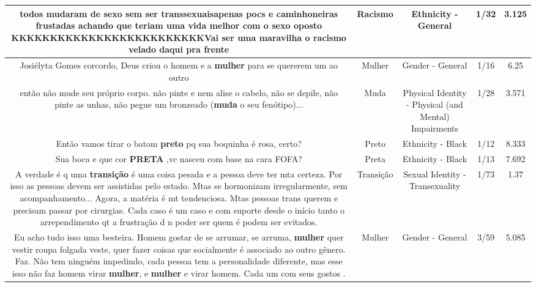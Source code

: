 \documentclass[11pt]{article}
\newlength\mylength
\begin{document}
\begin{center}
\begin{longtable}{|C{.65\mylength}|C{.30\mylength}|C{.12\mylength}|C{.12\mylength}|C{.12\mylength}|}
  \small todos mudaram de sexo sem ser transsexuaisapenas pocs e caminhoneiras frustadas achando que teriam uma vida melhor com o sexo oposto KKKKKKKKKKKKKKKKKKKKKKKKKVai ser uma maravilha o \textbf{racismo} velado daqui pra frente\normalsize   & Racismo & Ethnicity - General & 1/32 & 3.125 \\  \hline
  \small Josiélyta Gomes corcordo, Deus criou o homem e a \textbf{mulher} para se quererem um ao outro\normalsize   & Mulher & Gender - General & 1/16 & 6.25 \\  \hline
  \small então não mude seu próprio corpo. não pinte e nem alise o cabelo, não se depile, não pinte as unhas, não pegue um bronzeado (\textbf{muda} o seu fenótipo)...\normalsize   & Muda & Physical Identity - Physical (and Mental) Impairments & 1/28 & 3.571 \\  \hline
  \small Então vamos tirar o batom \textbf{preto} pq sua boquinha é rosa, certo?\normalsize   & Preto & Ethnicity - Black & 1/12 & 8.333 \\  \hline
  \small Sua boca e que cor \textbf{PRETA} ,vc nasceu com base na cara FOFA?\normalsize   & Preta & Ethnicity - Black & 1/13 & 7.692 \\  \hline
  \small A verdade é q uma \textbf{transição} é uma coisa pesada e a pessoa deve ter mta certeza. Por isso as pessoas devem ser assistidas pelo estado. Mtas se hormonizam irregularmente, sem acompanhamento... Agora, a matéria é mt tendenciosa. Mtas pessoas trans querem e precisam passar por cirurgias. Cada caso é um caso e com suporte desde o início tanto o arrependimento qt a frustração d n poder ser quem é podem ser evitados.\normalsize   & Transição & Sexual Identity - Transexuality & 1/73 & 1.37 \\  \hline
  \small Eu acho tudo isso uma besteira. Homem gostar de se arrumar, se arruma, \textbf{mulher} quer vestir roupa folgada veste, quer fazer coisas que socialmente é associado ao outro gênero. Faz. Não tem ninguém impedindo, cada pessoa tem a personalidade diferente, mas esse isso não faz homem virar \textbf{mulher}, e \textbf{mulher} e virar homem. Cada um com seus gostos .\normalsize   & Mulher & Gender - General & 3/59 & 5.085 \\  \hline

\end{longtable}
\end{center}
\end{document}
